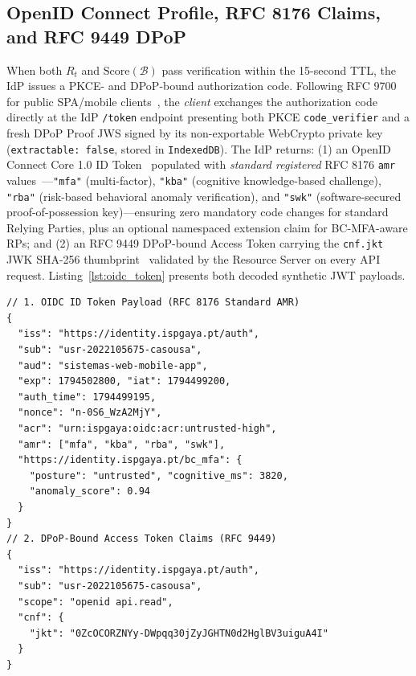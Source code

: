 \subsection{OpenID Connect Profile, RFC 8176 Claims, and RFC 9449 DPoP}
When both $R_t$ and $\text{Score}(\mathcal{B})$ pass verification within the 15-second TTL, the IdP issues a PKCE- and DPoP-bound authorization code. Following RFC 9700 for public SPA/mobile clients~\cite{rfc9700bcp}, the \emph{client} exchanges the authorization code directly at the IdP \texttt{/token} endpoint presenting both PKCE \texttt{code\_verifier} and a fresh DPoP Proof JWS signed by its non-exportable WebCrypto private key (\texttt{extractable: false}, stored in \texttt{IndexedDB}). The IdP returns: (1) an OpenID Connect Core 1.0 ID Token~\cite{oidc_core1} populated with \emph{standard registered} RFC 8176 \texttt{amr} values~\cite{rfc8176amr}—\texttt{"mfa"} (multi-factor), \texttt{"kba"} (cognitive knowledge-based challenge), \texttt{"rba"} (risk-based behavioral anomaly verification), and \texttt{"swk"} (software-secured proof-of-possession key)—ensuring zero mandatory code changes for standard Relying Parties, plus an optional namespaced extension claim for BC-MFA-aware RPs; and (2) an RFC 9449 DPoP-bound Access Token carrying the \texttt{cnf.jkt} JWK SHA-256 thumbprint~\cite{rfc9449dpop} validated by the Resource Server on every API request. Listing~\ref{lst:oidc_token} presents both decoded synthetic JWT payloads.

\noindent\begin{minipage}{\columnwidth}
\begin{lstlisting}[caption={Decoded OIDC ID Token (Registered RFC 8176 AMR) and RFC 9449 DPoP-Bound Access Token Confirmation Claims}, label={lst:oidc_token}, basicstyle=\ttfamily\scriptsize, numbers=none]
// 1. OIDC ID Token Payload (RFC 8176 Standard AMR)
{
  "iss": "https://identity.ispgaya.pt/auth",
  "sub": "usr-2022105675-casousa",
  "aud": "sistemas-web-mobile-app",
  "exp": 1794502800, "iat": 1794499200,
  "auth_time": 1794499195,
  "nonce": "n-0S6_WzA2MjY",
  "acr": "urn:ispgaya:oidc:acr:untrusted-high",
  "amr": ["mfa", "kba", "rba", "swk"],
  "https://identity.ispgaya.pt/bc_mfa": {
    "posture": "untrusted", "cognitive_ms": 3820,
    "anomaly_score": 0.94
  }
}
// 2. DPoP-Bound Access Token Claims (RFC 9449)
{
  "iss": "https://identity.ispgaya.pt/auth",
  "sub": "usr-2022105675-casousa",
  "scope": "openid api.read",
  "cnf": {
    "jkt": "0ZcOCORZNYy-DWpqq30jZyJGHTN0d2HglBV3uiguA4I"
  }
}
\end{lstlisting}
\end{minipage}
